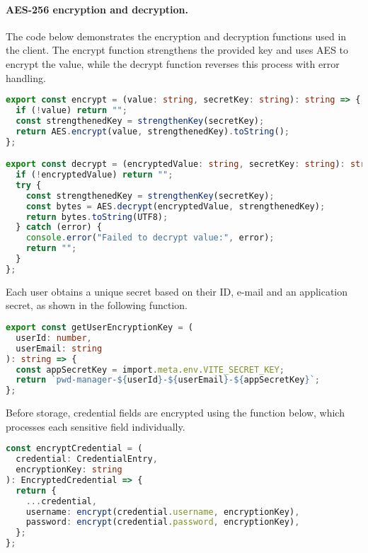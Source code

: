 \paragraph{AES-256 encryption and decryption.}
The code below demonstrates the encryption and decryption functions used in the client. The encrypt function strengthens the provided key and uses AES to encrypt the value, while the decrypt function reverses this process with error handling.

\begin{lstlisting}[language=TypeScript, caption={AES-256 encryption and decryption functions}, label={lst:encrypt-decrypt}]
export const encrypt = (value: string, secretKey: string): string => {
  if (!value) return "";
  const strengthenedKey = strengthenKey(secretKey);
  return AES.encrypt(value, strengthenedKey).toString();
};

export const decrypt = (encryptedValue: string, secretKey: string): string => {
  if (!encryptedValue) return "";
  try {
    const strengthenedKey = strengthenKey(secretKey);
    const bytes = AES.decrypt(encryptedValue, strengthenedKey);
    return bytes.toString(UTF8);
  } catch (error) {
    console.error("Failed to decrypt value:", error);
    return "";
  }
};
\end{lstlisting}

\clearpage

Each user obtains a unique secret based on their ID, e-mail and an application secret, as shown in the following function.

\begin{lstlisting}[language=TypeScript, caption={User-specific encryption key generation}, label={lst:user-key}]
export const getUserEncryptionKey = (
  userId: number,
  userEmail: string
): string => {
  const appSecretKey = import.meta.env.VITE_SECRET_KEY;
  return `pwd-manager-${userId}-${userEmail}-${appSecretKey}`;
};
\end{lstlisting}

Before storage, credential fields are encrypted using the function below, which processes each sensitive field individually.

\begin{lstlisting}[language=TypeScript, caption={Encryption of credential fields before storage}, label={lst:encrypt-credential}]
const encryptCredential = (
  credential: CredentialEntry,
  encryptionKey: string
): EncryptedCredential => {
  return {
    ...credential,
    username: encrypt(credential.username, encryptionKey),
    password: encrypt(credential.password, encryptionKey),
  };
};
\end{lstlisting}

